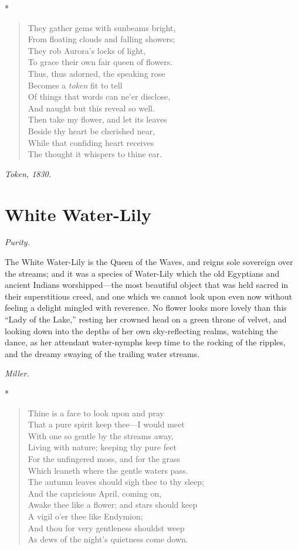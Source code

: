 \documentclass[11pt,twoside]{article}
\newcommand\flower[2]{\section*{#1}\addcontentsline{toc}{section}{#1}%
  \noindent\textit{#2.}\par\medskip}
\newcommand\stars{\begin{center}*\quad*\quad*\end{center}}
\newcommand\by[1]{\par\hfill\textit{#1}\par}
\begin{document}
\stars

\begin{verse}
They gather gems with sunbeams bright,\\
\quad From floating clouds and falling showers;\\
They rob Aurora’s locks of light,\\
\quad To grace their own fair queen of flowers.\\
Thus, thus adorned, the speaking rose\\
\quad Becomes a \emph{token} fit to tell\\
Of things that words can ne’er disclose,\\
\quad And naught but this reveal so well.\\
Then take my flower, and let its leaves\\
\quad Beside thy heart be cherished near,\\
While that confiding heart receives\\
\quad The thought it whispers to thine ear.
\end{verse}

\by{Token, 1830.}

\flower{White Water-Lily}{Purity}

The White Water-Lily is the Queen of the Waves, and reigns sole sovereign over the streams; and it was a species of Water-Lily which the old Egyptians and ancient Indians worshipped---the most beautiful object that was held sacred in their superstitious creed, and one which we cannot look upon even now without feeling a delight mingled with reverence. No flower looks more lovely than this “Lady of the Lake,” resting her crowned head on a green throne of velvet, and looking down into the depths of her own sky-reflecting realms, watching the dance, as her attendant water-nymphs keep time to the rocking of the ripples, and the dreamy swaying of the trailing water streams.

\by{Miller.}

\stars

\begin{verse}
Thine is a face to look upon and pray\\
That a pure spirit keep thee---I would meet\\
With one so gentle by the streams away,\\
Living with nature; keeping thy pure feet\\
For the unfingered moss, and for the grass\\
Which leaneth where the gentle waters pass.\\
The autumn leaves should sigh thee to thy sleep;\\
And the capricious April, coming on,\\
Awake thee like a flower; and stars should keep\\
A vigil o’er thee like Endymion;\\
And thou for very gentleness shouldst weep\\
As dews of the night’s quietness come down.
\end{verse}
\end{document}
